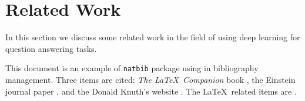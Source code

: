 \section{Related Work}
\label{sec:relatedwork}

In this section we discuss some related work in the field of using deep learning for question answering tasks.

This document is an example of \texttt{natbib} package using in bibliography management. Three items are cited: \textit{The \LaTeX\ Companion} book \cite{latexcompanion}, the Einstein journal paper \citet{einstein}, and the Donald Knuth's website \cite{knuthwebsite}. The \LaTeX\ related items are \cite{latexcompanion,knuthwebsite}. 